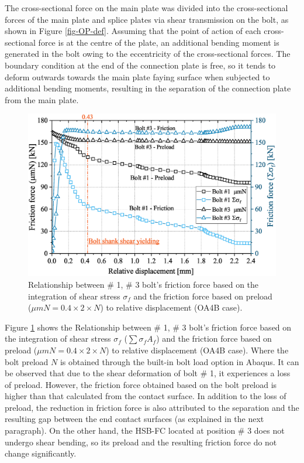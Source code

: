 The cross-sectional force on the main plate was divided into the cross-sectional forces of the main plate and splice plates via shear transmission on the bolt, as shown in Figure \ref{fig-OP-def}. Assuming that the point of action of each cross-sectional force is at the centre of the plate, an additional bending moment is generated in the bolt owing to the eccentricity of the cross-sectional forces. The boundary condition at the end of the connection plate is free, so it tends to deform outwards towards the main plate faying surface when subjected to additional bending moments, resulting in the separation of the connection plate from the main plate.

\begin{figure}[htbp]
    \centering
    \includegraphics[width=0.7\linewidth]{imgs/ch7/RD2NF.eps}
    \caption{Relationship between \# 1, \# 3 bolt's friction force based on the integration of shear stress $\sigma_f$ and the friction force based on preload ($\mu m N = 0.4 \times 2 \times N$) to relative displacement (OA4B case).}
    \label{fig-RD2NF}
\end{figure}

Figure \ref{fig-RD2NF} shows the Relationship between \# 1, \# 3 bolt's friction force based on the integration of shear stress $\sigma_f$ ($\sum \sigma_f A_f$) and the friction force based on preload ($\mu m N = 0.4 \times 2 \times N$) to relative displacement (OA4B case). Where the bolt preload $N$ is obtained through the built-in bolt load option in Abaqus. It can be observed that due to the shear deformation of bolt \# 1, it experiences a loss of preload. However, the friction force obtained based on the bolt preload is higher than that calculated from the contact surface. In addition to the loss of preload, the reduction in friction force is also attributed to the separation and the resulting gap between the end contact surfaces (as explained in the next paragraph). On the other hand, the HSB-FC located at position \# 3 does not undergo shear bending, so its preload and the resulting friction force do not change significantly.


